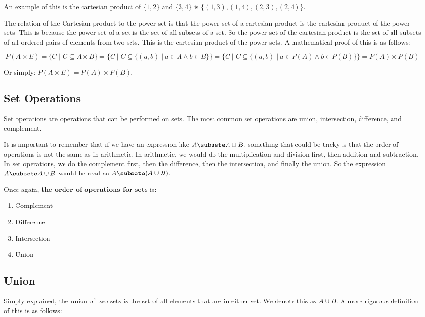 \documentclass[11pt]{article}
\begin{document}
An example of this is the cartesian product of \(\{1,2\}\) and \(\{3,4\}\) is \(\{(1,3), (1,4), (2,3), (2,4)\}\).

The relation of the Cartesian product to the power set is that the power set of a cartesian product is the cartesian product of the power sets. This is because the power set of a set is the set of all subsets of a set. So the power set of the cartesian product is the set of all subsets of all ordered pairs of elements from two sets. This is the cartesian product of the power sets. A mathematical proof of this is as follows:

\[
P(A \times B) = \{C \mid C \subseteq A \times B\} = \{C \mid C \subseteq \{(a,b) \mid a \in A \land b \in B\}\} = \{C \mid C \subseteq \{(a,b) \mid a \in P(A) \land b \in P(B)\}\} = P(A) \times P(B)
\]

Or simply: \(P(A \times B) = P(A) \times P(B)\).

\subsection{Set Operations}
\label{sec:org83ce5bd}
Set operations are operations that can be performed on sets. The most common set operations are union, intersection, difference, and complement.

It is important to remember that if we have an expression like \(A \subsete A \cup B\), something that could be tricky is that the order of operations is not the same as in arithmetic. In arithmetic, we would do the multiplication and division first, then addition and subtraction. In set operations, we do the complement first, then the difference, then the intersection, and finally the union. So the expression \(A \subsete A \cup B\) would be read as \(A \subsete (A \cup B)\).

Once again, \textbf{the order of operations for sets} is:
\begin{enumerate}
\item Complement
\item Difference
\item Intersection
\item Union
\end{enumerate}

\subsection{Union}
\label{sec:orgc596395}
Simply explained, the union of two sets is the set of all elements that are in either set. We denote this as \(A \cup B\). A more rigorous definition of this is as follows:
\end{document}
